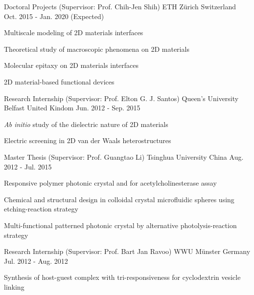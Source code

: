 

\begin{cventries}
\cventry
{Doctoral Projects (Supervisor: Prof.  Chih-Jen Shih)} %
{ETH Z\"{u}rich} %
{Switzerland} %
{Oct. 2015 - Jan. 2020 (Expected)} %
{
  \begin{cvitems}
  \item Multiscale modeling of 2D materials interfaces
  \item Theoretical study of macroscopic phenomena on 2D materials
  \item Molecular epitaxy on 2D materials interfaces
  \item 2D material-based functional devices
  \end{cvitems}
}

\cventry
{Research Internship (Supervisor: Prof.  Elton G. J. Santos)} %
{Queen's University Belfast} %
{United Kindom} %
{Jun. 2012 - Sep. 2015} %
{
  \begin{cvitems}
  \item \textit{Ab initio} study of the dielectric nature of 2D materials
  \item Electric screening in 2D van der Waals heterostructures
  \end{cvitems}
}

\cventry
{Master Thesis (Supervisor: Prof.  Guangtao Li)}
{Tsinghua University}
{China}
{Aug. 2012 - Jul. 2015}
{
  \begin{cvitems}
  \item Responsive polymer photonic crystal and for acetylcholinesterase assay
  \item Chemical and structural design in colloidal crystal microfluidic spheres using etching-reaction strategy
  \item Multi-functional patterned photonic crystal by alternative photolysis-reaction strategy
  \end{cvitems}
}

\cventry
{Research Internship (Supervisor: Prof. Bart Jan Ravoo)} %
{WWU M\"{u}nster} %
{Germany} %
{Jul. 2012 - Aug. 2012} %
{
  \begin{cvitems}
  \item Synthesis of host-guest complex with tri-responsiveness for
    cyclodextrin vesicle linking
  \end{cvitems}
}


\end{cventries}

